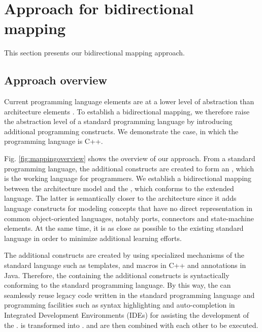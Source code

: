 \section{Approach for bidirectional mapping}
\label{sec:approach}
This section presents our bidirectional mapping approach.%


\subsection{Approach overview}
Current programming language elements are at a lower level of abstraction than architecture elements \cite{DeSilva2012}.
To establish a bidirectional mapping, we therefore raise the abstraction level of a standard programming language by introducing additional programming constructs.
We demonstrate the case, in which the programming language is C++.

Fig. \ref{fig:mappingoverview} shows the overview of our approach.
From a standard programming language, the additional constructs are created to form an , which is the working language for programmers.
We establish a bidirectional mapping between the architecture model and the , which conforms to the extended language.
The latter is semantically closer to the architecture since it adds language constructs for modeling concepts that have no direct representation in common object-oriented languages, notably ports, connectors and state-machine elements. 
At the same time, it is as close as possible to the existing standard language in order to minimize additional learning efforts.

The additional constructs are created by using specialized mechanisms of the standard language such as templates, and macros in C++ and annotations in Java.
Therefore, the  containing the additional constructs is syntactically conforming to the standard programming language. 
By this way, the  can seamlessly reuse legacy code written in the standard programming language and programming facilities such as syntax highlighting and auto-completion in Integrated Development Environments (IDEs) for assisting the development of the . 
 is transformed into .  and  are then combined with each other to be executed.

